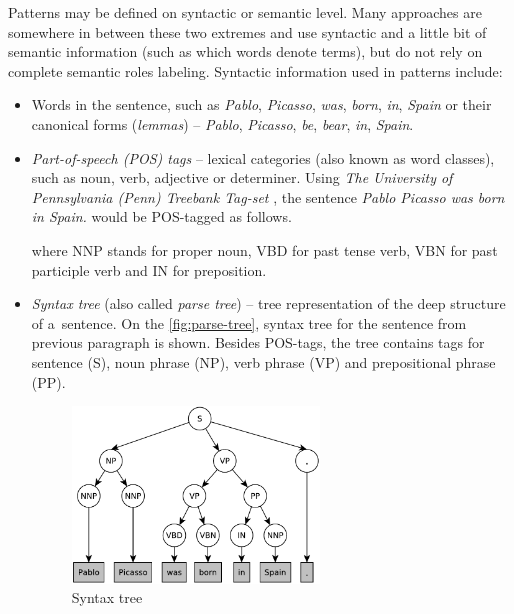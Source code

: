 \documentclass[12pt, twoside]{fithesis2}
\renewcommand{\_}{\leavevmode \kern0.07em\vbox{\hrule width0.4em}}
\newcommand{\squarebullet}{\textcolor{black}{\raisebox{0.15em}{\rule{4pt}{4pt}}}}
\newcommand{\emptysquarebullet}{\textcolor{black}{\raisebox{0.10em}{\tiny$\square$}}}
\newenvironment{myItemize}{
  \begin{itemize}[leftmargin=2em,rightmargin=1em,itemsep=\parskip ,parsep=0em,topsep=0em,partopsep=0em]
  \renewcommand{\labelitemi}{\squarebullet}
  \renewcommand{\labelitemii}{\textbullet}
}{
  \end{itemize}
}
\begin{document}
Patterns may be defined on syntactic or semantic level.
Many approaches are somewhere in between these two extremes and use syntactic and a little bit of semantic information (such as which words denote terms), but do not rely on complete semantic roles labeling. Syntactic information used in patterns include:
\begin{myItemize}
  \item Words in the sentence, such as \emph{Pablo}, \emph{Picasso}, \emph{was}, \emph{born}, \emph{in}, \emph{Spain}
    or their canonical forms (\textit{lemmas}) -- \emph{Pablo}, \emph{Picasso}, \emph{be}, \emph{bear}, \emph{in}, \emph{Spain}.

  \item \textit{Part-of-speech (POS) tags} -- lexical categories (also known as word classes), such as noun, verb, adjective or determiner.
    Using \textit{The University of Pennsylvania (Penn) Treebank Tag-set} \cite{penn-tagset},
    the sentence \emph{Pablo Picasso was born in Spain.} would be POS-tagged as follows.
\begin{code}
\end{code}
    where NNP stands for proper noun, VBD for past tense verb, VBN for past participle verb and IN for preposition.

  \item \textit{Syntax tree} (also called \emph{parse tree}) -- tree representation of the deep structure of a~sentence.
    On the \autoref{fig:parse-tree}, syntax tree for the sentence from previous paragraph is shown.
    Besides POS-tags, the tree contains tags for sentence (S), noun phrase (NP), verb phrase (VP) and prepositional phrase (PP).
  \begin{figure}[h]
    \centering
    \includegraphics[width=0.62\textwidth]{images/parse-tree.pdf}
    \caption{Syntax tree}
    \label{fig:parse-tree}
  \end{figure}
\end{myItemize}
\end{document}
